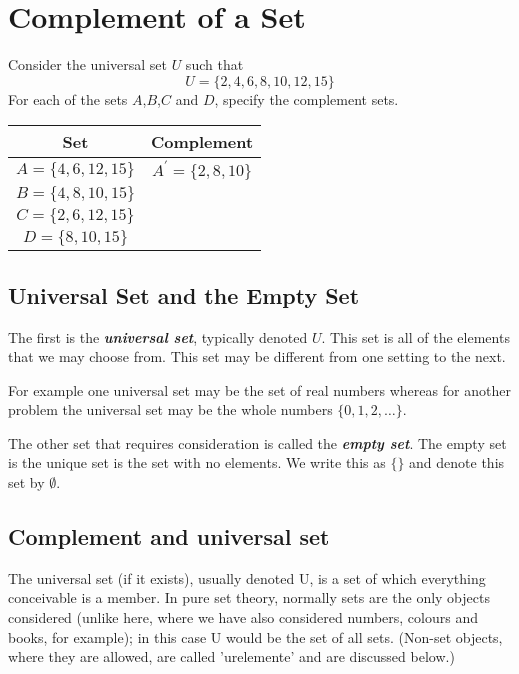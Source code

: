 
\section*{Complement of a Set}
Consider the universal set $U$ such that
\[U=\{2,4,6,8,10,12,15\} \]
For each of the sets $A$,$B$,$C$ and $D$, specify the complement sets.
{
	\LARGE
\begin{center}
\begin{tabular}{|c|c|}
  \hline
Set &\phantom{sp} Complement \phantom{sp}\\
\hline \phantom{sp} $A=\{4,6,12,15\}$ \phantom{sp} &
$A^{\prime}=\{2,8,10\}$ \\ \hline $B=\{4,8,10,15\}$ & \\ \hline
$C=\{2,6,12,15\}$ & \\ \hline $D=\{8,10,15\}$ & \\ \hline

\end{tabular}
\end{center}
}




\subsection{Universal Set and the Empty Set}
The first is the \textbf{\textit{universal set}}, typically denoted $U$. This set is all of the elements that we may choose from. This set may be different from one setting to the next. 

For example one universal set may be the set of real numbers whereas for another problem the universal set may be the whole numbers $\{0, 1, 2,\ldots\}$.

The other set that requires consideration is called the \textit{\textbf{empty set}}. The empty set is the unique set is the set with no elements. We write this as $\{ \}$ and denote this set by $\emptyset$.





\subsection{Complement and universal set}

The universal set (if it exists), usually denoted U, is a set of which everything conceivable is a member. In pure set theory, normally sets are the only objects considered (unlike here, where we have also considered numbers, colours and books, for example); in this case U would be the set of all sets. (Non-set objects, where they are allowed, are called 'urelemente' and are discussed below.)

